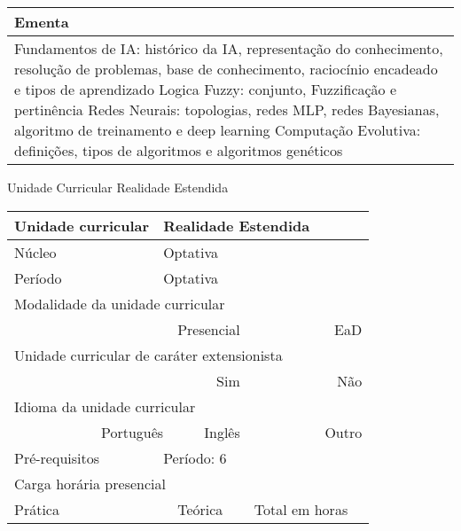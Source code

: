 \begin{quadro}[ht!]
\begin{tabular}{|p{3cm} p{2cm} p{3cm} p{2cm} p{3cm} p{2cm}|}
\multicolumn{6}{|p{15cm}|}{\cellcolor{blue1} Ementa} \\\hline
\hline\multicolumn{6}{|p{15cm}|}{\scriptsize Fundamentos de IA: histórico da IA, representação do conhecimento, resolução de problemas, base de conhecimento, raciocínio encadeado e tipos de aprendizado Logica Fuzzy: conjunto, Fuzzificação e pertinência Redes Neurais: topologias, redes MLP, redes Bayesianas, algoritmo de treinamento e deep learning Computação Evolutiva: definições, tipos de algoritmos e algoritmos genéticos}\\\hline
\hline
	\end{tabular}
\end{quadro}
\begin{quadro}[ht!]
  \centering\scriptsize
\caption{Unidade Curricular Realidade Estendida}
\label{ unit_49 }
\begin{tabular}{|p{3cm} p{2cm} p{3cm} p{2cm} p{3cm} p{2cm}|}\hline
\multicolumn{1}{|p{3cm}|}{\cellcolor{blue1} Unidade curricular} & \multicolumn{5}{p{9cm}|}{ Realidade Estendida }\\\hline
\multicolumn{1}{|p{3cm}|}{\cellcolor{blue1} Núcleo} & \multicolumn{5}{p{11.5cm}|}{ Optativa }\\\hline
\multicolumn{1}{|p{3cm}|}{\cellcolor{blue1} Período} & \multicolumn{5}{p{9cm}|}{ Optativa }\\\hline
\multicolumn{6}{|p{15cm}|}{\cellcolor{blue1} Modalidade da unidade curricular} \\\hline
\multicolumn{2}{|r}{		} &  \multicolumn{2}{r}{Presencial \Square } & \multicolumn{2}{r|}{EaD \XBox	} \\\hline
\multicolumn{6}{|p{15cm}|}{\cellcolor{blue1} Unidade curricular de caráter extensionista} \\\hline
\multicolumn{4}{|r}{			Sim \Square	} & \multicolumn{2}{r|}{	Não \XBox	}\\\hline
\multicolumn{6}{|p{15cm}|}{\cellcolor{blue1} Idioma da unidade curricular} \\ \hline
\multicolumn{2}{|r}{	Português \XBox	} &  \multicolumn{2}{r}{	Inglês \Square	} & \multicolumn{2}{r|}{	Outro \Square	} \\ \hline
\multicolumn{1}{|p{3cm}|}{\cellcolor{blue1} Pré-requisitos} & \multicolumn{5}{p{9cm}|}{ Período: 6 }\\ \hline
\multicolumn{6}{|p{15cm}|}{\cellcolor{blue1} Carga horária presencial} \\ \hline
\multicolumn{1}{|p{3cm}|}{\raggedleft Prática} & \multicolumn{1}{p{1cm}|}{\centering	0	} &  \multicolumn{1}{p{3cm}|}{\raggedleft Teórica}  & \multicolumn{1}{p{1cm}|}{\centering 	0 } & \multicolumn{1}{p{3cm}|}{\raggedleft Total em horas} & \multicolumn{1}{p{1cm}|}{\raggedleft	0	} \\ \hline

\end{tabular}
\end{quadro}
